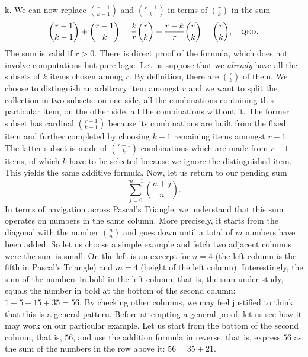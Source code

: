 k\). We can now replace \(\binom{r-1}{k-1}\) and \(\binom{r-1}{k}\) in
terms of \(\binom{r}{k}\) in the sum
\[
\binom{r-1}{k-1} + \binom{r-1}{k} = \frac{k}{r}\binom{r}{k}
+ \frac{r-k}{r}\binom{r}{k} = \binom{r}{k},\quad \text{\textsc{qed.}}
\]
The sum is valid if \(r > 0\). There is direct proof of the formula,
which does not involve computations but pure logic. Let us suppose
that we \emph{already} have all the subsets of \(k\) items chosen
among \(r\). By definition, there are \(\binom{r}{k}\) of them. We
choose to distinguish an arbitrary item amongst \(r\) and we want to
split the collection in two subsets: on one side, all the combinations
containing this particular item, on the other side, all the
combinations without it. The former subset has cardinal
\(\binom{r-1}{k-1}\) because its combinations are built from the fixed
item and further completed by choosing \(k-1\) remaining items amongst
\(r-1\). The latter subset is made of \(\binom{r-1}{k}\) combinations
which are made from \(r-1\) items, of which \(k\) have to be selected
because we ignore the distinguished item. This yields the same
additive formula. Now, let us return to our pending sum
\[
\sum_{j=0}^{m-1}{\binom{n+j}{n}}.
\]
\noindent In terms of navigation across Pascal's Triangle, we
understand that this sum operates on numbers in the same column. More
precisely, it starts from the diagonal with the number
\(\binom{n}{n}\) and goes down until a total of \(m\) numbers have
been added. So let us choose a simple example and fetch two adjacent
columns were the sum is small. On the left is an excerpt for \(n=4\)
(the left column is the fifth in Pascal's Triangle) and \(m=4\)
(height of the left column). Interestingly, the sum of the numbers in
bold in the left column, that is, the sum under study, equals the number
in bold at the bottom of the second column: \(1 + 5 + 15 + 35 =
56\). By checking other columns, we may feel justified to think that
this is a general pattern. Before attempting a general proof, let us
see how it may work on our particular example. Let us start from the
bottom of the second column, that is, \(56\), and use the addition
formula in reverse, that is, express \(56\) as the sum of the numbers
in the row above it: \(56 = 35 + 21\).


